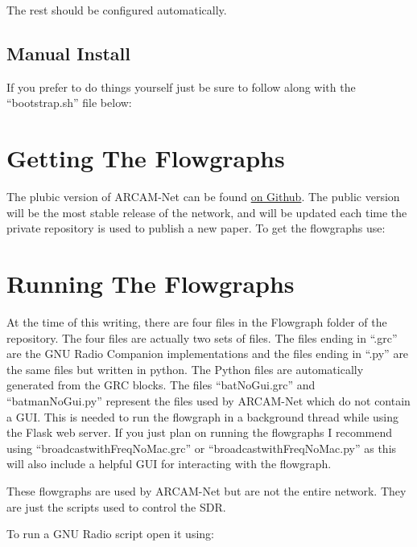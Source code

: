 The rest should be configured automatically.

\subsection{Manual Install}

If you prefer to do things yourself just be sure to follow along with the ``bootstrap.sh'' file below:



\section{Getting The Flowgraphs}

The plubic version of ARCAM-Net can be found \href{https://github.com/jmccormack200/ARCAM-Net-Public.git}{on Github}. The public version will be the most stable release of the network, and will be updated each time the private repository is used to publish a new paper. To get the flowgraphs use: \\


\section{Running The Flowgraphs}

At the time of this writing, there are four files in the Flowgraph folder of the repository. The four files are actually two sets of files. The files ending in ``.grc'' are the GNU Radio Companion implementations and the files ending in ``.py'' are the same files but written in python. The Python files are automatically generated from the GRC blocks. The files ``batNoGui.grc'' and ``batmanNoGui.py'' represent the files used by ARCAM-Net which do not contain a GUI. This is needed to run the flowgraph in a background thread while using the Flask web server. If you just plan on running the flowgraphs I recommend using ``broadcastwithFreqNoMac.grc'' or ``broadcastwithFreqNoMac.py'' as this will also include a helpful GUI for interacting with the flowgraph.

These flowgraphs are used by ARCAM-Net but are not the entire network. They are just the scripts used to control the SDR. 

To run a GNU Radio script open it using: \\

